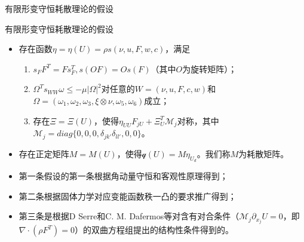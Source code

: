 \documentclass[mathserif]{beamer}
\begin{document}
\begin{frame}{有限形变守恒耗散理论的假设}
\begin{block}{有限形变守恒耗散理论的假设}
\begin{itemize}
		\item<2-> 存在函数$\eta = \eta (U) = \rho s(\nu,u,F,w,c)$，满足
		\begin{enumerate}
			\item<3-> $s_F F^T= F s_F^T,s(OF) = Os(F)$（其中$O$为旋转矩阵）；
			\item<4-> $	\Omega^T s_{WW} \omega \le -\mu |\Omega|^2$对任意的$W= (\nu,u,F,c,w)$和$	\Omega = (\omega_1 , \omega_2 ,\omega_3, \xi \otimes \nu, \omega_5 , \omega_6)$成立；
			\item<5-> 存在$\Xi=\Xi(U)$，使得$\eta_{UU} F_{jU} + \Xi_U^T \mathcal{M}_j$对称，其中$\mathcal{M}_j=diag\{0,0,0, \delta_{jk'} \delta_{ll'},0,0\}$。
		\end{enumerate}
		\item<6-> 存在正定矩阵$M = M(U)$，使得$\mathcal{q}(U) = M \eta_{U_d}$。我们称$M$为耗散矩阵。
\end{itemize}
\end{block}
\begin{itemize}
\item<7-> 第一条假设的第一条根据角动量守恒和客观性原理得到；
\item<8-> 第二条根据固体力学对应变能函数秩一凸的要求推广得到；
\item<9-> 第三条是根据D Serre和C. M. Dafermos等对含有对合条件（$\mathcal{M}_j \partial_{x_j} U =0$，即$\nabla \cdot(\rho F^T)=0$）的双曲方程组提出的结构性条件得到的。
\end{itemize}
\end{frame}
\end{document}
